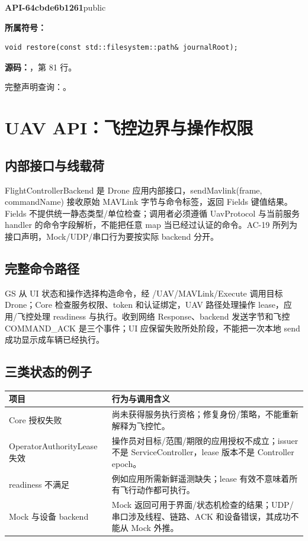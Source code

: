 \textbf{API-64cbde6b1261}\quad public\par
\textbf{所属符号：}\par
\begin{Verbatim}[fontsize=\footnotesize,breaklines,breakanywhere]
void restore(const std::filesystem::path& journalRoot);
\end{Verbatim}
\textbf{源码：}，第 81 行。\par

完整声明查询：。

\section{UAV API：飞控边界与操作权限}

\subsection{内部接口与线载荷}
FlightControllerBackend 是 Drone 应用内部接口，sendMavlink(frame, commandName) 接收原始 MAVLink 字节与命令标签，返回 Fields 键值结果。Fields 不提供统一静态类型/单位检查；调用者必须遵循 UavProtocol 与当前服务 handler 的命令字段解析，不能把任意 map 当已经过认证的命令。AC-19 所列为接口声明，Mock/UDP/串口行为要按实际 backend 分开。

\subsection{完整命令路径}
GS 从 UI 状态和操作选择构造命令，经 /UAV/MAVLink/Execute 调用目标 Drone；Core 检查服务权限、token 和认证绑定，UAV 路径处理操作 lease，应用/飞控处理 readiness 与执行。收到网络 Response、backend 发送字节和飞控 COMMAND\_ACK 是三个事件；UI 应保留失败所处阶段，不能把一次本地 send 成功显示成车辆已经执行。

\subsection{三类状态的例子}

\begin{longtable}{@{}p{43mm}p{119mm}@{}}
\toprule
项目 & 行为与调用含义 \\
\midrule\endhead
Core 授权失败 & 尚未获得服务执行资格；修复身份/策略，不能重新解释为飞控忙。 \\
OperatorAuthorityLease 失效 & 操作员对目标/范围/期限的应用授权不成立；issuer 不是 ServiceController，lease 版本不是 Controller epoch。 \\
readiness 不满足 & 例如应用所需新鲜遥测缺失；lease 有效不意味着所有飞行动作都可执行。 \\
Mock 与设备 backend & Mock 返回可用于界面/状态机检查的结果；UDP/串口涉及线程、链路、ACK 和设备错误，其成功不能从 Mock 外推。 \\
\bottomrule
\end{longtable}

